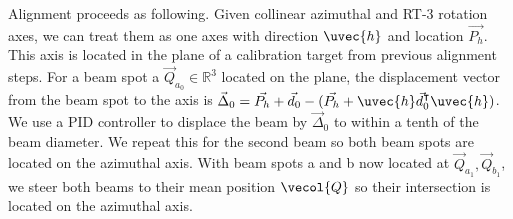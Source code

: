 Alignment proceeds as following. Given collinear azimuthal and RT-3 rotation axes, we can treat them as one axes with direction $\uvec{h}$ and location $\vec{P_h}$. This axis is located in the plane of a calibration target from previous alignment steps. For a beam spot a $\vec{Q}_{a_0} \in \mathbb{R}^3$ located on the plane, the displacement vector from the beam spot to the axis is $\vec{\Delta}_0 = \vec{P_h} + \vec{d}_0 - (\vec{P_h} + \uvec{h} \vec{d}_0^\intercal \uvec{h})$. We use a PID controller to displace the beam by $\vec{\Delta}_0$ to within a tenth of the beam diameter. We repeat this for the second beam so both beam spots are located on the azimuthal axis. With beam spots a and b now located at $\vec{Q}_{a_1}, \vec{Q}_{b_1}$, we steer both beams to their mean position $\vecol{Q}$ so their intersection is located on the azimuthal axis.

